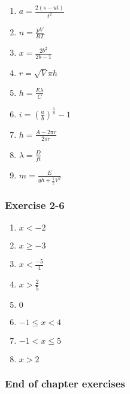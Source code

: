 {\begin{multicols}{3}
\begin{enumerate}[itemsep=1pt,  label=\textbf{\arabic*}. ] 
\item $a = \frac{2(s - ut)}{t^2}$%
\item $n = \frac{pV}{RT}$%
\item $x = \frac{2b^2}{2b - 1}$%
\item $r = \sqrt{V}{\pi h}$%
\item $h = \frac{E\lambda}{C}$%
\item $i = (\frac{a}{b})^{\frac{1}{n}} - 1$%
\item $h = \frac{A - 2\pi r}{2\pi r}$%
\item $\lambda = \frac{D}{ft}$%
\item $m =\frac{E}{gh + \frac{1}{2}V^2}$%
\end{enumerate}


\subsubsection*{Exercise 2-6} %


\begin{enumerate}[itemsep=1pt,, label=\textbf{\arabic*}. ] 
    \item $x <-2$%
    \item $x \geq -3$%
    \item $x < \frac{-5}{4}$ %
\item $x> \frac{2}{5}$
    \item $0$%
    \item $-1 \leq x < 4$%
    \item $-1 < x \leq 5$%
    \item $x > 2$%
    \end{enumerate}

\subsubsection*{End of chapter exercises} %



\end{multicols}}
